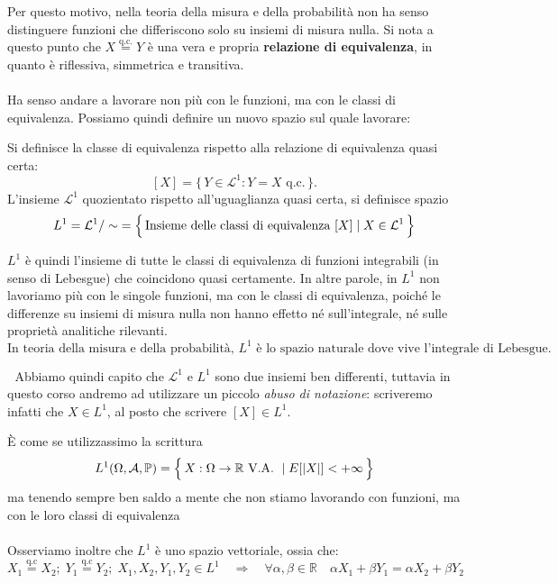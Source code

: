 \medskip

\noindent
Per questo motivo, nella teoria della misura e della probabilità non ha senso distinguere funzioni che differiscono solo su insiemi di misura nulla.  
Si nota a questo punto che $X\overset{\text{q.c.}}{=}Y$ è una vera e propria \textbf{relazione di equivalenza}, in quanto è riflessiva, simmetrica e transitiva.\\
\\
Ha senso andare a lavorare non più con le funzioni, ma con le classi di equivalenza. Possiamo quindi definire un nuovo spazio sul quale lavorare:
\begin{definizione}
    Si definisce la classe di equivalenza rispetto alla relazione di equivalenza quasi certa:
    \[
        [X] = \{\, Y \in \mathcal{L}^1 : Y = X \text{ q.c.} \,\}.
    \]
    L'insieme $\mathcal{L}^1$ quozientato rispetto all'uguaglianza quasi certa, si definisce spazio \[L^1 = \mathcal{L}^1 /\sim\; = \Bigl\{\,\text{Insieme delle classi di equivalenza }[X] \mid X\in \mathcal{L}^1\,\Bigr\}\]
\end{definizione}

$L^1$ è quindi l'insieme di tutte le classi di equivalenza di funzioni integrabili (in senso di Lebesgue) che coincidono quasi certamente.  
In altre parole, in $L^1$ non lavoriamo più con le singole funzioni, ma con le classi di equivalenza, poiché le differenze su insiemi di misura nulla non hanno effetto né sull'integrale, né sulle proprietà analitiche rilevanti.
\[
\boxed{\text{In teoria della misura e della probabilità, } L^1 \text{ è lo spazio naturale dove vive l'integrale di Lebesgue.}}
\]

\faWarning $\;$ Abbiamo quindi capito che $\mathcal{L}^1$ e $L^1$ sono due insiemi ben differenti, tuttavia in questo corso andremo ad utilizzare un piccolo \textit{abuso di notazione}: scriveremo infatti che $X\in L^1$, al posto che scrivere $[X]\in L^1$.

\medskip
\noindent È come se utilizzassimo la scrittura
\[L^1(\Omega, \mathcal{A}, \mathbb{P}) = \Bigl\{\,X:\Omega\to\mathbb{R} \text{ V.A. } \mid E[|X|]<+\infty\,\Bigr\}\]
ma tenendo sempre ben saldo a mente che non stiamo lavorando con funzioni, ma con le loro classi di equivalenza \faWarning\\
\\
Osserviamo inoltre che $L^1$ è  uno spazio vettoriale, ossia che:
\[X_1 \overset{\text{q.c}}{=} X_2;\;Y_1 \overset{\text{q.c}}{=} Y_2; \; X_1, X_2, Y_1, Y_2 \in L^1 \quad \Rightarrow\quad \forall \alpha, \beta \in \mathbb{R}\quad \alpha X_1 + \beta Y_1 = \alpha X_2 + \beta Y_2\]

